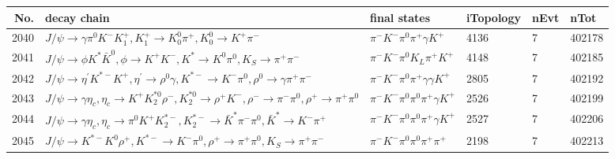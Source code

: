 \begin{table}[htbp] 
\begin{center}
\begin{small}
\begin{tabular}{rlllll}\hline\hline
 No. & decay chain & final states &  iTopology & nEvt & nTot \\\hline
2040&$J/\psi       \rightarrow \gamma       \pi^{0}        K^{-}          K_1^{+}        , K_1^{+}         \rightarrow K_0^{0}        \pi^{+}        , K_0^{0}         \rightarrow K^{+}          \pi^{-}        $&$\pi^{-}        K^{-}          \pi^{0}        \pi^{+}        \gamma       K^{+}          $& 4136&    7&402178\\
2041&$J/\psi       \rightarrow \phi           K^{*}          \bar{K}^{0}   , \phi            \rightarrow K^{+}          K^{-}          , K^{*}           \rightarrow K^{0}          \pi^{0}        , K_{S}           \rightarrow \pi^{+}        \pi^{-}        $&$\pi^{-}        K^{-}          \pi^{0}        K_{L}          \pi^{+}        K^{+}          $& 4148&    7&402185\\
2042&$J/\psi       \rightarrow \eta^{\prime} K^{*-}         K^{+}          , \eta^{\prime}  \rightarrow \rho^{0}      \gamma       , K^{*-}          \rightarrow K^{-}          \pi^{0}        , \rho^{0}       \rightarrow \gamma       \pi^{+}        \pi^{-}        $&$\pi^{-}        K^{-}          \pi^{0}        \pi^{+}        \gamma       \gamma       K^{+}          $& 2805&    7&402192\\
2043&$J/\psi       \rightarrow \gamma       \eta_{c}    , \eta_{c}     \rightarrow K^{+}          K_2^{*0}       \rho^{-}      , K_2^{*0}        \rightarrow \rho^{+}      K^{-}          , \rho^{-}       \rightarrow \pi^{-}        \pi^{0}        , \rho^{+}       \rightarrow \pi^{+}        \pi^{0}        $&$\pi^{-}        K^{-}          \pi^{0}        \pi^{0}        \pi^{+}        \gamma       K^{+}          $& 2526&    7&402199\\
2044&$J/\psi       \rightarrow \gamma       \eta_{c}    , \eta_{c}     \rightarrow \pi^{0}        K^{+}          K_2^{*-}       , K_2^{*-}        \rightarrow \bar{K}^{*}   \pi^{-}        \pi^{0}        , \bar{K}^{*}    \rightarrow K^{-}          \pi^{+}        $&$\pi^{-}        K^{-}          \pi^{0}        \pi^{0}        \pi^{+}        \gamma       K^{+}          $& 2527&    7&402206\\
2045&$J/\psi       \rightarrow K^{*-}         K^{0}          \rho^{+}      , K^{*-}          \rightarrow K^{-}          \pi^{0}        , \rho^{+}       \rightarrow \pi^{+}        \pi^{0}        , K_{S}           \rightarrow \pi^{+}        \pi^{-}        $&$\pi^{-}        K^{-}          \pi^{0}        \pi^{0}        \pi^{+}        \pi^{+}        $& 2198&    7&402213\\

\end{tabular}
\end{small}
\end{center}
\end{table}
